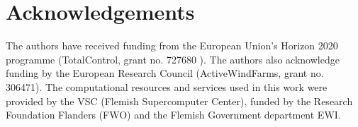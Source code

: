 \documentclass[a4paper]{jpconf}
\begin{document}

\section*{Acknowledgements}
The authors have received funding from the European Union’s Horizon 2020 programme (TotalControl, grant no. 727680 ). The authors also acknowledge funding by the European Research Council (ActiveWindFarms, grant no. 306471). The computational resources and services used in this work were provided by the VSC (Flemish Supercomputer Center), funded by the Research Foundation Flanders (FWO) and the Flemish Government department EWI. 
\end{document}
